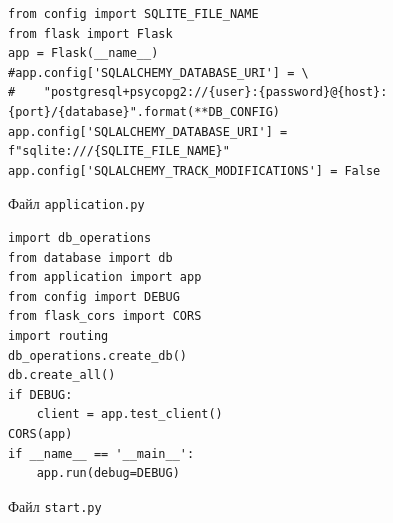 \documentclass[14pt,final]{report}
\begin{document}
\begin{listing}[htbp]
\begin{center}
{\footnotesize
\begin{verbatim}
from config import SQLITE_FILE_NAME
from flask import Flask
app = Flask(__name__)
#app.config['SQLALCHEMY_DATABASE_URI'] = \
#    "postgresql+psycopg2://{user}:{password}@{host}:{port}/{database}".format(**DB_CONFIG)
app.config['SQLALCHEMY_DATABASE_URI'] = f"sqlite:///{SQLITE_FILE_NAME}"
app.config['SQLALCHEMY_TRACK_MODIFICATIONS'] = False
\end{verbatim}}
\end{center}
\caption{Файл \texttt{application.py}}\label{lst:app}
\end{listing}

\begin{listing}[htbp]
\begin{center}
{\footnotesize
\begin{verbatim}
import db_operations
from database import db
from application import app
from config import DEBUG
from flask_cors import CORS
import routing
db_operations.create_db()
db.create_all()
if DEBUG:
    client = app.test_client()
CORS(app)
if __name__ == '__main__':
    app.run(debug=DEBUG)
\end{verbatim}}
\end{center}
\caption{Файл \texttt{start.py}}\label{lst:start}
\end{listing}
\end{document}
